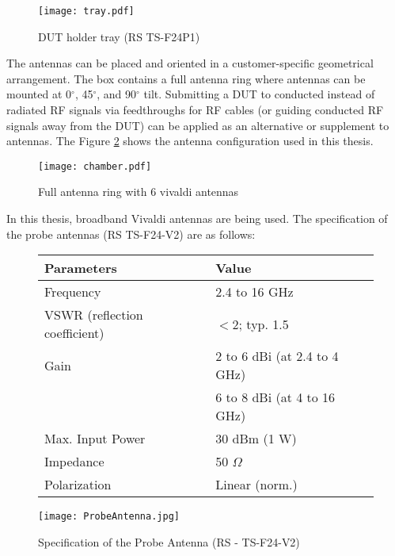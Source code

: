 \begin{figure}[H]
\centering
\texttt{[image: tray.pdf]}
\caption{ DUT holder tray (\acs{RS}\textregistered{} TS-F24P1) \cite{ts7124}}
\label{fig:try}
\end{figure}

The antennas can be placed and oriented in a customer-specific geometrical arrangement. The box contains a full antenna ring where antennas can be mounted at 0$^{\circ}$, 45$^{\circ}$, and 90$^{\circ}$ tilt.  Submitting a \acs{DUT} to conducted instead of radiated \acs{RF} signals via feedthroughs for \acs{RF} cables (or guiding conducted \acs{RF} signals away from the \acs{DUT}) can be applied as an alternative or supplement to antennas. The Figure \ref{fig:box} shows the antenna configuration used in this thesis.

\begin{figure}[H]
\centering
\texttt{[image: chamber.pdf]}
\caption{Full antenna ring with 6 vivaldi antennas}
\label{fig:box}
\end{figure}

In this thesis, broadband Vivaldi antennas are being used. The specification of the probe antennas (\acs{RS}\textregistered{} TS-F24-V2) are as follows: 


\begin{figure}[h]
    \begin{minipage}[c]{.7\textwidth}%
        \begin {tabular} {|l|l|} 
\toprule
Parameters & Value \\ 
\midrule 
Frequency & 2.4 to 16 GHz \\
VSWR (reflection coefficient) & $<$2; typ. 1.5 \\
Gain & 2 to 6 dBi (at 2.4 to 4 GHz)\\ 
 & 6 to 8 dBi (at 4 to 16 GHz)\\ 
Max. Input Power & 30 dBm (1 W) \\
Impedance & 50 $\Omega$ \\
Polarization & Linear (norm.)\\
\bottomrule
\end {tabular}    \end{minipage}
    \hfill
    \begin{minipage}[c]{.2\textwidth}
        \texttt{[image: ProbeAntenna.jpg]}
    \end{minipage}
    \caption{Specification of the Probe Antenna (\acs{RS}\textregistered{} - TS-F24-V2) \cite{ts7124}}
\label{fig:probes}
\end{figure}      

